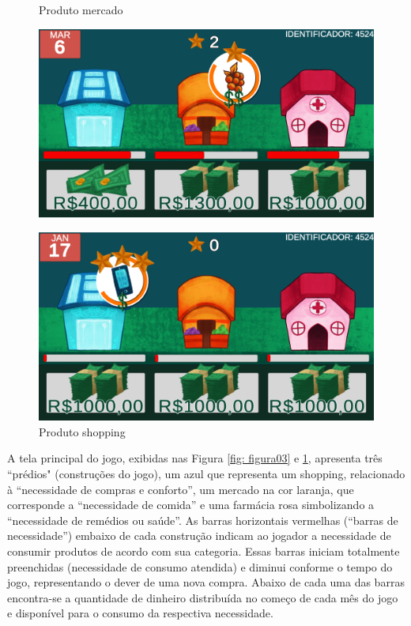 \graphicspath{{figuras/}}
\begin{figure}[!ht]
\center
\begin{minipage}{0.4\linewidth}
\centering
\caption{Produto mercado} \label{fig: figura03}
\includegraphics[width=1.0\linewidth]{03-figura_tela-jogo-mercado.png}
\end{minipage}
\begin{minipage}{0.4\linewidth}
\centering
\caption{Produto shopping} \label{fig: figura04}
\includegraphics[width=1.0\linewidth]{04-figura_tela-jogo-shopping.png}
\end{minipage}
\end{figure}

A tela principal do jogo, exibidas nas  Figura \ref{fig: figura03} e \ref{fig: figura04}, apresenta três “prédios" (construções do jogo), um azul que representa um shopping, relacionado à “necessidade de compras e conforto”, um mercado na cor laranja, que corresponde a “necessidade de comida” e uma farmácia rosa simbolizando a “necessidade de remédios ou saúde”. As barras horizontais vermelhas (“barras de necessidade”) embaixo de cada construção indicam ao jogador a necessidade de consumir produtos de acordo com sua categoria. Essas barras iniciam totalmente preenchidas (necessidade de consumo atendida) e diminui conforme o tempo do jogo, representando o dever de uma nova compra. Abaixo de cada uma das barras encontra-se a quantidade de dinheiro distribuída no começo de cada mês do jogo e disponível para o consumo da respectiva necessidade.

